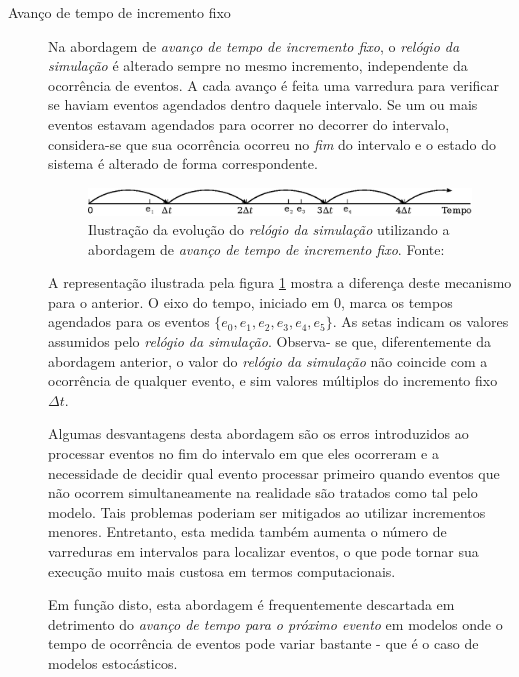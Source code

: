\begin{description}
\item[Avanço de tempo de incremento fixo] \hfill

Na abordagem de \textit{avanço de tempo de incremento fixo}, o \textit{relógio
da simulação} é alterado sempre no mesmo incremento, independente da ocorrência
de eventos. A cada avanço é feita uma varredura para verificar se haviam eventos
agendados dentro daquele intervalo. Se um ou mais eventos estavam agendados para
ocorrer no decorrer do intervalo, considera-se que sua ocorrência ocorreu no
\textit{fim} do intervalo e o estado do sistema é alterado de forma
correspondente.

\begin{figure}[htb!]
\centering\includegraphics{img/fixed.eps}
\caption{\label{fig:fixedtime}Ilustração da evolução do \textit{relógio da simulação} utilizando a abordagem de \textit{avanço de tempo de incremento fixo}. Fonte:~\cite{Law}}
\end{figure}

A representação ilustrada pela figura \ref{fig:fixedtime} mostra a diferença
deste mecanismo para o anterior. O eixo do tempo, iniciado em 0, marca os tempos
agendados para os eventos $\{e_{0}, e_{1}, e_{2}, e_{3}, e_{4}, e_{5}\}$. As
setas indicam os valores assumidos pelo \textit{relógio da simulação}. Observa-
se que, diferentemente da abordagem anterior, o valor do \textit{relógio da
simulação} não coincide com a ocorrência de qualquer evento, e sim valores
múltiplos do incremento fixo $\Delta t$.

Algumas desvantagens desta abordagem são os erros introduzidos ao processar
eventos no fim do intervalo em que eles ocorreram e a necessidade de decidir
qual evento processar primeiro quando eventos que não ocorrem simultaneamente na
realidade são tratados como tal pelo modelo. Tais problemas poderiam ser
mitigados ao utilizar incrementos menores. Entretanto, esta medida também
aumenta o número de varreduras em intervalos para localizar eventos, o que pode
tornar sua execução muito mais custosa em termos computacionais.

Em função disto, esta abordagem é frequentemente descartada em detrimento do
\textit{avanço de tempo para o próximo evento} em modelos onde o tempo de
ocorrência de eventos pode variar bastante - que é o caso de modelos
estocásticos.

\end{description}

